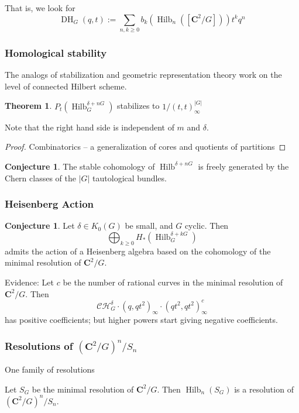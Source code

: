 \documentclass{amsart}[12pt]
\theoremstyle{definition}
\newtheorem{theorem}[dummy]{Theorem}
\newtheorem{conjecture}[dummy]{Conjecture}
\newcommand{\C}{\mathbf{C}}
\DeclareMathOperator{\Hilb}{Hilb}
\DeclareMathOperator{\DC}{DH}
\begin{document}
That is, we look for 
$$\DC_G(q,t):=\sum_{n,k\geq 0 } b_k(\Hilb_n([\C^2/G])) t^kq^n$$







\subsubsection{Homological stability}

The analogs of stabilization and geometric representation theory work on the level of connected Hilbert scheme.

\begin{theorem} 
$P_t(\Hilb^{\delta+nG}_G)$ stabilizes to $1/(t,t)_\infty^{|G|}$
\end{theorem}
Note that the right hand side is independent of $m$ and $\delta$.
\begin{proof} Combinatorics -- a generalization of cores and quotients of partitions \end{proof}

\begin{conjecture}
The stable cohomology of $\Hilb^{\delta+nG}$ is freely generated by the Chern classes of the $|G|$ tautological bundles.
\end{conjecture}



\subsubsection{Heisenberg Action}


\begin{conjecture}
Let $\delta\in K_0(G)$ be small, and $G$ cyclic.  Then
$$\bigoplus_{k\geq 0} H_*(\Hilb^{\delta+kG}_G)$$ admits the action of a Heisenberg algebra based on the cohomology of the minimal resolution of $\C^2/G$.
\end{conjecture}

Evidence:
Let $c$ be the number of rational curves in the minimal resolution of $\C^2/G$.  Then
$$\mathcal{CH}^\delta_G\cdot(q,qt^2)_\infty\cdot (qt^2,qt^2)_\infty^c$$
has positive coefficients; but higher powers start giving negative coefficients.


\subsubsection{Resolutions of $(\C^2/G)^n/S_n$}
One family of resolutions

Let $S_G$ be the minimal resolution of $\C^2/G$.  Then $\Hilb_n(S_G)$ is a resolution of $(\C^2/G)^n/S_n$.
\end{document}
